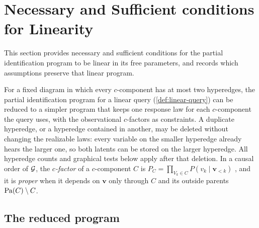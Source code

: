 \section{Necessary and Sufficient conditions for Linearity}
\label{sec:theorem}
This section provides necessary and sufficient conditions for the partial identification program to be linear in its free parameters, and records which assumptions preserve that linear program.

For a fixed diagram in which every $c$-component has at most two hyperedges, the partial identification program for a linear query (\cref{def:linear-query}) can be reduced to a simpler program that keeps one response law for each $c$-component the query uses, with the observational $c$-factors as constraints. A duplicate hyperedge, or a hyperedge contained in another, may be deleted without changing the realizable laws: every variable on the smaller hyperedge already hears the larger one, so both latents can be stored on the larger hyperedge. All hyperedge counts and graphical tests below apply after that deletion. In a causal order of $\mathcal{G}$, the \emph{$c$-factor} of a $c$-component $C$ is $P_C=\prod_{V_k\in C}P(v_k\mid\mathbf{v}_{<k})$ \citep{tian2002general}, and it is \emph{proper} when it depends on $\mathbf{v}$ only through $C$ and its outside parents $\operatorname{Pa}(C)\setminus C$.

\subsection{The reduced program}
\label{sec:reduced}

